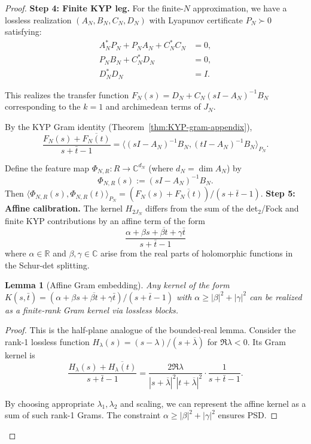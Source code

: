 \documentclass[11pt]{article}
\newtheorem{lemma}[theorem]{Lemma}
\theoremstyle{definition}
\theoremstyle{remark}
\begin{document}
\begin{proof}
\medskip
\noindent\textbf{Step 4: Finite KYP leg.}
For the finite-$N$ approximation, we have a lossless realization $(A_N, B_N, C_N, D_N)$ with Lyapunov certificate $P_N \succ 0$ satisfying:
\begin{align}
  A_N^* P_N + P_N A_N + C_N^* C_N &= 0,\\
  P_N B_N + C_N^* D_N &= 0,\\
  D_N^* D_N &= I.
\end{align}

This realizes the transfer function $F_N(s) = D_N + C_N(sI - A_N)^{-1}B_N$ corresponding to the $k=1$ and archimedean terms of $J_N$.

By the KYP Gram identity (Theorem~\ref{thm:KYP-gram-appendix}),
\[
  \frac{F_N(s) + \overline{F_N(t)}}{s + \bar t - 1} = \langle (sI - A_N)^{-1}B_N, (tI - A_N)^{-1}B_N \rangle_{P_N}.
\]

Define the feature map $\Phi_{N,R}: R \to \mathbb{C}^{d_N}$ (where $d_N = \dim A_N$) by
\[
  \Phi_{N,R}(s) := (sI - A_N)^{-1}B_N.
\]
Then $\langle \Phi_{N,R}(s), \Phi_{N,R}(t) \rangle_{P_N} = (F_N(s) + \overline{F_N(t)})/(s + \bar t - 1)$.
\medskip
\noindent\textbf{Step 5: Affine calibration.}
The kernel $H_{2J_N}$ differs from the sum of the det$_2$/Fock and finite KYP contributions by an affine term of the form
\[
  \frac{\alpha + \beta s + \overline{\beta t} + \gamma \bar t}{s + \bar t - 1}
\]
where $\alpha \in \mathbb{R}$ and $\beta, \gamma \in \mathbb{C}$ arise from the real parts of holomorphic functions in the Schur-det splitting.

\begin{lemma}[Affine Gram embedding]\label{lem:affine-gram-embedding}
Any kernel of the form $K(s,\bar t) = (\alpha + \beta s + \overline{\beta t} + \gamma \bar t)/(s + \bar t - 1)$ with $\alpha \geq |\beta|^2 + |\gamma|^2$ can be realized as a finite-rank Gram kernel via lossless blocks.
\end{lemma}

\begin{proof}
This is the half-plane analogue of the bounded-real lemma.
Consider the rank-1 lossless function $H_\lambda(s) = (s - \lambda)/(s + \overline{\lambda})$ for $\Re \lambda < 0$. Its Gram kernel is
\[
  \frac{H_\lambda(s) + \overline{H_\lambda(t)}}{s + \bar t - 1} = \frac{2\Re \lambda}{|s + \overline{\lambda}|^2 |t + \overline{\lambda}|^2} \cdot \frac{1}{s + \bar t - 1}.
\]

By choosing appropriate $\lambda_1, \lambda_2$ and scaling, we can represent the affine kernel as a sum of such rank-1 Grams. The constraint $\alpha \geq |\beta|^2 + |\gamma|^2$ ensures PSD.
\end{proof}


\end{proof}
\end{document}
